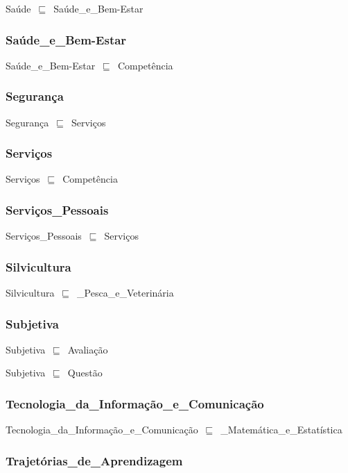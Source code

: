 \documentclass{article}
\begin{document}
Saúde~\ensuremath{\sqsubseteq}~Saúde\_e\_Bem-Estar~

\subsubsection*{Saúde\_e\_Bem-Estar}

Saúde\_e\_Bem-Estar~\ensuremath{\sqsubseteq}~Competência~

\subsubsection*{Segurança}

Segurança~\ensuremath{\sqsubseteq}~Serviços~

\subsubsection*{Serviços}

Serviços~\ensuremath{\sqsubseteq}~Competência~

\subsubsection*{Serviços\_Pessoais}

Serviços\_Pessoais~\ensuremath{\sqsubseteq}~Serviços~

\subsubsection*{Silvicultura}

Silvicultura~\ensuremath{\sqsubseteq}~\_Pesca\_e\_Veterinária~

\subsubsection*{Subjetiva}

Subjetiva~\ensuremath{\sqsubseteq}~Avaliação~

Subjetiva~\ensuremath{\sqsubseteq}~Questão~

\subsubsection*{Tecnologia\_da\_Informação\_e\_Comunicação}

Tecnologia\_da\_Informação\_e\_Comunicação~\ensuremath{\sqsubseteq}~\_Matemática\_e\_Estatística~

\subsubsection*{Trajetórias\_de\_Aprendizagem}
\end{document}
